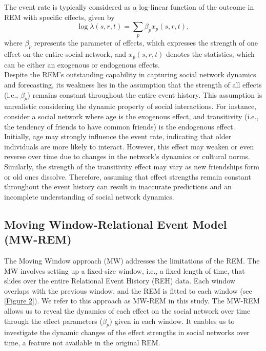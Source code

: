 \documentclass[]{interact}
\theoremstyle{plain}%
\theoremstyle{definition}
\theoremstyle{remark}
\begin{document}
{	The event rate is typically considered as a log-linear function of the outcome in REM with specific effects, given by
	\begin{equation} \label{3}
		\log \lambda(s,r,t) = \sum_{p} \beta_p x_p(s,r,t),
	\end{equation}
	where $\beta_p$ represents the parameter of effects, which expresses the strength of one effect on the entire social network, and $x_p(s,r,t)$ denotes the statistics, which can be either an exogenous or endogenous effects. \\
	
	Despite the REM's outstanding capability in capturing social network dynamics and forecasting, its weakness lies in the assumption that the strength of all effects (i.e., $\beta_p$) remains constant throughout the entire event history. This assumption is unrealistic considering the dynamic property of social interactions. For instance, consider a social network where age is the exogenous effect, and transitivity (i.e., the tendency of friends to have common friends) is the endogenous effect. Initially, age may strongly influence the event rate, indicating that older individuals are more likely to interact. However, this effect may weaken or even reverse over time due to changes in the network's dynamics or cultural norms. Similarly, the strength of the transitivity effect may vary as new friendships form or old ones dissolve. Therefore, assuming that effect strengths remain constant throughout the event history can result in inaccurate predictions and an incomplete understanding of social network dynamics.
	
	\subsection{Moving Window-Relational Event Model (MW-REM)} \label{sec:MW-REM}
	
	\hspace{0.23cm} The Moving Window approach (MW) \cite{mulderModelingEvolutionInteraction2019} addresses the limitations of the REM. The MW involves setting up a fixed-size window, i.e., a fixed length of time, that slides over the entire Relational Event History (REH) data. Each window overlaps with the previous window, and the REM is fitted to each window (see \autoref{Figure 2}). We refer to this approach as MW-REM in this study. The MW-REM allows us to reveal the dynamics of each effect on the social network over time through the effect parameters ($\beta_p$) given in each window. It enables us to investigate the dynamic changes of the effect strengths in social networks over time, a feature not available in the original REM. \\

}
\end{document}
